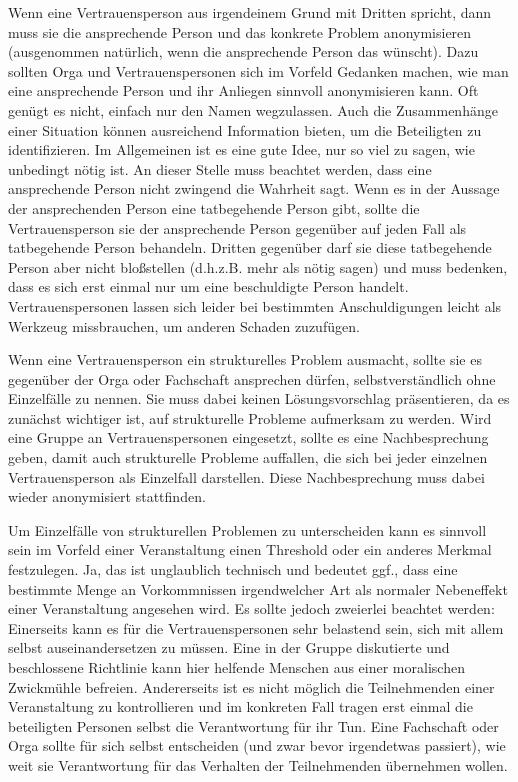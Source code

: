 \documentclass[DIV=calc]{scrartcl}
\begin{document}
Wenn eine Vertrauensperson aus irgendeinem Grund mit Dritten spricht, dann muss sie die ansprechende Person und das konkrete Problem anonymisieren (ausgenommen natürlich, wenn die ansprechende Person das wünscht). Dazu sollten Orga und Vertrauenspersonen sich im Vorfeld Gedanken machen, wie man eine ansprechende Person und ihr Anliegen sinnvoll anonymisieren kann. Oft genügt es nicht, einfach nur den Namen wegzulassen. Auch die Zusammenhänge einer Situation können ausreichend Information bieten, um die Beteiligten zu identifizieren. Im Allgemeinen ist es eine gute Idee, nur so viel zu sagen, wie unbedingt nötig ist.
An dieser Stelle muss beachtet werden, dass eine ansprechende Person nicht zwingend die Wahrheit sagt. Wenn es in der Aussage der ansprechenden Person eine tatbegehende Person gibt, sollte die Vertrauensperson sie der ansprechende Person gegenüber auf jeden Fall als tatbegehende Person behandeln. Dritten gegenüber darf sie diese tatbegehende Person aber nicht bloßstellen (d.h.z.B. mehr als nötig sagen) und muss bedenken, dass es sich erst einmal nur um eine beschuldigte Person handelt. Vertrauenspersonen lassen sich leider bei bestimmten Anschuldigungen leicht als Werkzeug missbrauchen, um anderen Schaden zuzufügen.

Wenn eine Vertrauensperson ein strukturelles Problem ausmacht, sollte sie es gegenüber der Orga oder Fachschaft ansprechen dürfen, selbstverständlich ohne Einzelfälle zu nennen. Sie muss dabei keinen Lösungsvorschlag präsentieren, da es zunächst wichtiger ist, auf strukturelle Probleme aufmerksam zu werden.
Wird eine Gruppe an Vertrauenspersonen eingesetzt, sollte es eine Nachbesprechung geben, damit auch strukturelle Probleme auffallen, die sich bei jeder einzelnen Vertrauensperson als Einzelfall darstellen. Diese Nachbesprechung muss dabei wieder anonymisiert stattfinden.

Um Einzelfälle von strukturellen Problemen zu unterscheiden kann es sinnvoll sein im Vorfeld einer Veranstaltung einen Threshold oder ein anderes Merkmal festzulegen. Ja, das ist unglaublich technisch und bedeutet ggf., dass eine bestimmte Menge an Vorkommnissen irgendwelcher Art als normaler Nebeneffekt einer Veranstaltung angesehen wird. Es sollte jedoch zweierlei beachtet werden:
Einerseits kann es für die Vertrauenspersonen sehr belastend sein, sich mit allem selbst auseinandersetzen zu müssen. Eine in der Gruppe diskutierte und beschlossene Richtlinie kann hier helfende Menschen aus einer moralischen Zwickmühle befreien.
Andererseits ist es nicht möglich die Teilnehmenden einer Veranstaltung zu kontrollieren und im konkreten Fall tragen erst einmal die beteiligten Personen selbst die Verantwortung für ihr Tun. Eine Fachschaft oder Orga sollte für sich selbst entscheiden (und zwar bevor irgendetwas passiert), wie weit sie Verantwortung für das Verhalten der Teilnehmenden übernehmen wollen.
\end{document}
